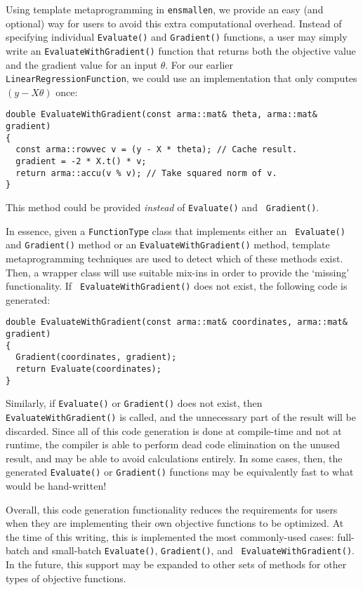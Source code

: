 \documentclass{article}
\begin{document}
Using template metaprogramming in {\tt ensmallen}, we provide an easy (and
optional) way for users to avoid this extra computational overhead.  Instead of
specifying individual {\tt Evaluate()} and {\tt Gradient()} functions, a user
may simply write an {\tt EvaluateWithGradient()} function that returns both the
objective value and the gradient value for an input $\theta$.  For our earlier
\texttt{LinearRegressionFunction}, we could use an implementation that only
computes $(y - X \theta)$ once:

\begin{verbatim}
double EvaluateWithGradient(const arma::mat& theta, arma::mat& gradient)
{
  const arma::rowvec v = (y - X * theta); // Cache result.
  gradient = -2 * X.t() * v;
  return arma::accu(v % v); // Take squared norm of v.
}
\end{verbatim}

This method could be provided {\it instead} of {\tt Evaluate()} and {\tt
Gradient()}.

In essence, given a {\tt FunctionType} class that implements either an {\tt
Evaluate()} and {\tt Gradient()} method or an {\tt EvaluateWithGradient()}
method, template metaprogramming techniques are used to detect which of these
methods exist.  Then, a wrapper class will use suitable mix-ins %
in order to provide the `missing' functionality.  If {\tt
EvaluateWithGradient()} does not exist, the following code is generated:

\begin{verbatim}
double EvaluateWithGradient(const arma::mat& coordinates, arma::mat& gradient)
{
  Gradient(coordinates, gradient);
  return Evaluate(coordinates);
}
\end{verbatim}

Similarly, if {\tt Evaluate()} or {\tt Gradient()} does not exist, then {\tt
EvaluateWithGradient()} is called, and the unnecessary part of the result will
be discarded.  Since all of this code generation is done at compile-time and not
at runtime, the compiler is able to perform dead code elimination %
on the unused result, and may be able to avoid calculations entirely.  In some
cases, then, the generated {\tt Evaluate()} or {\tt Gradient()} functions may be
equivalently fast to what would be hand-written!

Overall, this code generation functionality reduces the requirements for users
when they are implementing their own objective functions to be optimized.  At
the time of this writing, this is implemented the most commonly-used cases:
full-batch and small-batch {\tt Evaluate()}, {\tt Gradient()}, and {\tt
EvaluateWithGradient()}.  In the future, this support may be expanded to other
sets of methods for other types of objective functions.
\end{document}
